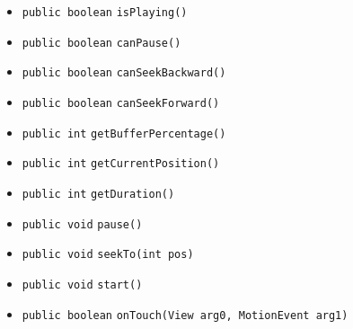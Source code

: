 \begin{itemize}
\item \lstinline|public boolean| \lstinline|isPlaying|\lstinline|()| \\[-0.6em]




\item \lstinline|public boolean| \lstinline|canPause|\lstinline|()| \\[-0.6em]




\item \lstinline|public boolean| \lstinline|canSeekBackward|\lstinline|()| \\[-0.6em]




\item \lstinline|public boolean| \lstinline|canSeekForward|\lstinline|()| \\[-0.6em]




\item \lstinline|public int| \lstinline|getBufferPercentage|\lstinline|()| \\[-0.6em]




\item \lstinline|public int| \lstinline|getCurrentPosition|\lstinline|()| \\[-0.6em]




\item \lstinline|public int| \lstinline|getDuration|\lstinline|()| \\[-0.6em]




\item \lstinline|public void| \lstinline|pause|\lstinline|()| \\[-0.6em]




\item \lstinline|public void| \lstinline|seekTo|\lstinline|(int pos)| \\[-0.6em]




\item \lstinline|public void| \lstinline|start|\lstinline|()| \\[-0.6em]




\item \lstinline|public boolean| \lstinline|onTouch|\lstinline|(View arg0, MotionEvent arg1)| \\[-0.6em]





\end{itemize}
